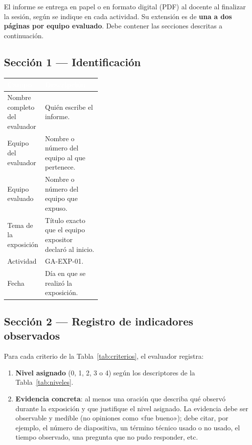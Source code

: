\documentclass[11pt]{article}
\newcommand{\bhdr}[1]{\cellcolor{midblue}\textcolor{white}{\textbf{#1}}}
\begin{document}
El informe se entrega en papel o en formato digital (PDF) al docente al finalizar la sesión, según se indique en cada actividad. Su extensión es de \textbf{una a dos páginas por equipo evaluado}. Debe contener las secciones descritas a continuación.

\subsection{\textcolor{midblue}{Sección 1 --- Identificación}}

\noindent\begin{tabularx}{\linewidth}{|L{0.38\linewidth}|Y|}
	\hline
	\bhdr{Campo} & \bhdr{Descripción}\\
	\hline
	Nombre completo del evaluador & Quién escribe el informe.\\
	\hline
	 Equipo del evaluador & Nombre o número del equipo al que pertenece.\\
	\hline
	Equipo evaluado & Nombre o número del equipo que expuso.\\
	\hline
	 Tema de la exposición & Título exacto que el equipo expositor declaró al inicio.\\
	\hline
	Actividad & GA-EXP-01.\\
	\hline
	 Fecha & Día en que se realizó la exposición.\\
	\hline
\end{tabularx}

\subsection{\textcolor{midblue}{Sección 2 --- Registro de indicadores observados}}

Para cada criterio de la Tabla~\ref{tab:criterios}, el evaluador registra:
\begin{enumerate}[leftmargin=18pt,itemsep=3pt]
	\item \textbf{Nivel asignado} (0, 1, 2, 3 o 4) según los descriptores de la Tabla~\ref{tab:niveles}.
	\item \textbf{Evidencia concreta}: al menos una oración que describa qué observó durante la exposición y que justifique el nivel asignado. La evidencia debe ser observable y medible (no opiniones como «fue bueno»); debe citar, por ejemplo, el número de diapositiva, un término técnico usado o no usado, el tiempo observado, una pregunta que no pudo responder, etc.
\end{enumerate}
\end{document}
